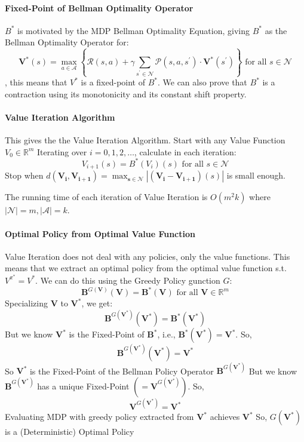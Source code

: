 \documentclass[11pt]{article}
\begin{document}
\paragraph*{Fixed-Point of Bellman Optimality Operator}
$B^*$ is motivated by the MDP Bellman Optimality Equation, giving $B^*$ as the Bellman Optimality Operator for:
$$
\boldsymbol{V}^*(s)=\max _{a \in \mathcal{A}}\left\{\mathcal{R}(s, a)+\gamma \sum_{s^{\prime} \in \mathcal{N}} \mathcal{P}\left(s, a, s^{\prime}\right) \cdot \boldsymbol{V}^*\left(s^{\prime}\right)\right\} \text { for all } s \in \mathcal{N}
$$,
this means that $V^*$ is a fixed-point of $B^*$.
We can also prove that $B^*$ is a contraction using its monotonicity and its constant shift property.

\paragraph*{Value Iteration Algorithm}
This gives the the Value Iteration Algorithm.
Start with any Value Function $V_0 \in \mathbb{R}^m$
Iterating over $i=0,1,2, \ldots$, calculate in each iteration:
$$
V_{i+1}(s)=B^*\left(V_i\right)(s) \text { for all } s \in \mathcal{N}
$$
Stop when $d\left(\boldsymbol{V}_{\boldsymbol{i}}, \boldsymbol{V}_{\boldsymbol{i}+\boldsymbol{1}}\right)=\max _{\boldsymbol{s} \in \mathcal{N}}\left|\left(\boldsymbol{V}_{\boldsymbol{i}}-\boldsymbol{V}_{\boldsymbol{i}+\boldsymbol{1}}\right)(s)\right|$ is small enough.

The running time of each iteration of Value Iteration is $O(m^2k)$ where $|\mathcal{N}| = m, |\mathcal{A}| = k$.

\paragraph*{Optimal Policy from Optimal Value Function}
Value Iteration does not deal with any policies, only the value functions. This means that we extract an optimal policy from the optimal value function s.t. $V^{\pi^*} = V^*$. We can do this using the Greedy Policy gunction $G$:
$$
\boldsymbol{B}^{G(\boldsymbol{V})}(\boldsymbol{V})=\boldsymbol{B}^*(\boldsymbol{V}) \text { for all } \boldsymbol{V} \in \mathbb{R}^m
$$
Specializing $\boldsymbol{V}$ to $\boldsymbol{V}^*$, we get:
$$
\boldsymbol{B}^{G\left(\boldsymbol{V}^*\right)}\left(\boldsymbol{V}^*\right)=\boldsymbol{B}^*\left(\boldsymbol{V}^*\right)
$$
But we know $\boldsymbol{V}^*$ is the Fixed-Point of $\boldsymbol{B}^*$, i.e., $\boldsymbol{B}^*\left(\boldsymbol{V}^*\right)=\boldsymbol{V}^*$. So,
$$
\boldsymbol{B}^{G\left(\boldsymbol{V}^*\right)}\left(\boldsymbol{V}^*\right)=\boldsymbol{V}^*
$$
So $\boldsymbol{V}^*$ is the Fixed-Point of the Bellman Policy Operator $\boldsymbol{B}^{G\left(\boldsymbol{V}^*\right)}$ But we know $\boldsymbol{B}^{G\left(\boldsymbol{V}^*\right)}$ has a unique Fixed-Point $\left(=\boldsymbol{V}^{G\left(\boldsymbol{V}^*\right)}\right)$. So,
$$
\boldsymbol{V}^{G\left(\boldsymbol{V}^*\right)}=\boldsymbol{V}^*
$$
Evaluating MDP with greedy policy extracted from $\boldsymbol{V}^*$ achieves $\boldsymbol{V}^*$ So, $G\left(\boldsymbol{V}^*\right)$ is a (Deterministic) Optimal Policy
\end{document}
